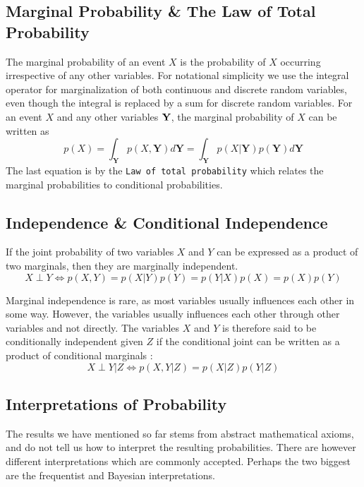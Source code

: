 \subsection{Marginal Probability \& The Law of Total Probability}
The marginal probability of an event $X$ is the probability of $X$ occurring irrespective of any other variables.
For notational simplicity we use the integral operator for marginalization of both continuous and discrete random variables, even though the integral is replaced by a sum for discrete random variables. For an event $X$ and any other variables $\bf Y$, the marginal probability of $X$ can be written as
\begin{equation}
    p(X) = \int_{\boldsymbol{Y}} p(X, \boldsymbol{Y}) d\boldsymbol{Y} = \int_{\boldsymbol{Y}} p(X | \boldsymbol{Y}) p(\boldsymbol{Y}) d\boldsymbol{Y}
\end{equation}
The last equation is by the \texttt{Law of total probability} which relates the marginal probabilities to conditional probabilities.

\subsection{Independence \& Conditional Independence}
If the joint probability of two variables $X$ and $Y$ can be expressed as a product of two marginals, then they are marginally independent.
\begin{equation}
    X \perp Y \iff p(X, Y) = p(X | Y)p(Y) = p(Y | X)p(X) = p(X)p(Y)
\end{equation}

Marginal independence is rare, as most variables usually influences each other in some way. However, the variables usually influences each other through other variables and not directly. The variables $X$ and $Y$ is therefore said to be conditionally independent given $Z$ if the conditional joint can be written as a product of conditional marginals \cite[p.~31]{murphy}:
\begin{equation}\label{eq:conditional_independence}
    X \perp Y | Z \iff p(X, Y | Z) = p(X | Z)p(Y | Z)
\end{equation}

\subsection{Interpretations of Probability}
The results we have mentioned so far stems from abstract mathematical axioms, and do not tell us how to interpret the resulting probabilities. There are however different interpretations which are commonly accepted. Perhaps the two biggest are the frequentist and Bayesian interpretations. 

